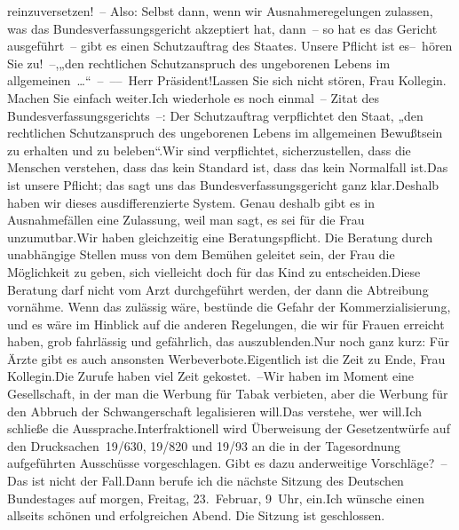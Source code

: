 \documentclass{article}
\begin{document}
reinzuversetzen! – Also: Selbst dann, wenn wir Ausnahmeregelungen zulassen, was das Bundesverfassungsgericht akzeptiert hat, dann – so hat es das Gericht ausgeführt – gibt es einen Schutzauftrag des Staates. Unsere Pflicht ist es– hören Sie zu! –,„den rechtlichen Schutzanspruch des ungeborenen Lebens im allgemeinen …“ – –– Herr Präsident!Lassen Sie sich nicht stören, Frau Kollegin. Machen Sie einfach weiter.Ich wiederhole es noch einmal – Zitat des Bundesverfassungsgerichts –: Der Schutzauftrag verpflichtet den Staat, „den rechtlichen Schutzanspruch des ungeborenen Lebens im allgemeinen Bewußtsein zu erhalten und zu beleben“.Wir sind verpflichtet, sicherzustellen, dass die Menschen verstehen, dass das kein Standard ist, dass das kein Normalfall ist.Das ist unsere Pflicht; das sagt uns das Bundesverfassungsgericht ganz klar.Deshalb haben wir dieses ausdifferenzierte System. Genau deshalb gibt es in Ausnahmefällen eine Zulassung, weil man sagt, es sei für die Frau unzumutbar.Wir haben gleichzeitig eine Beratungspflicht. Die Beratung durch unabhängige Stellen muss von dem Bemühen geleitet sein, der Frau die Möglichkeit zu geben, sich vielleicht doch für das Kind zu entscheiden.Diese Beratung darf nicht vom Arzt durchgeführt werden, der dann die Abtreibung vornähme. Wenn das zulässig wäre, bestünde die Gefahr der Kommerzialisierung, und es wäre im Hinblick auf die anderen Regelungen, die wir für Frauen erreicht haben, grob fahrlässig und gefährlich, das auszublenden.Nur noch ganz kurz: Für Ärzte gibt es auch ansonsten Werbeverbote.Eigentlich ist die Zeit zu Ende, Frau Kollegin.Die Zurufe haben viel Zeit gekostet. –Wir haben im Moment eine Gesellschaft, in der man die Werbung für Tabak verbieten, aber die Werbung für den Abbruch der Schwangerschaft legalisieren will.Das verstehe, wer will.Ich schließe die Aussprache.Interfraktionell wird Überweisung der Gesetzentwürfe auf den Drucksachen 19/630, 19/820 und 19/93 an die in der Tagesordnung aufgeführten Ausschüsse vorgeschlagen. Gibt es dazu anderweitige Vorschläge? – Das ist nicht der Fall.Dann berufe ich die nächste Sitzung des Deutschen Bundestages auf morgen, Freitag, 23. Februar, 9 Uhr, ein.Ich wünsche einen allseits schönen und erfolgreichen Abend. Die Sitzung ist geschlossen.
\end{document}
